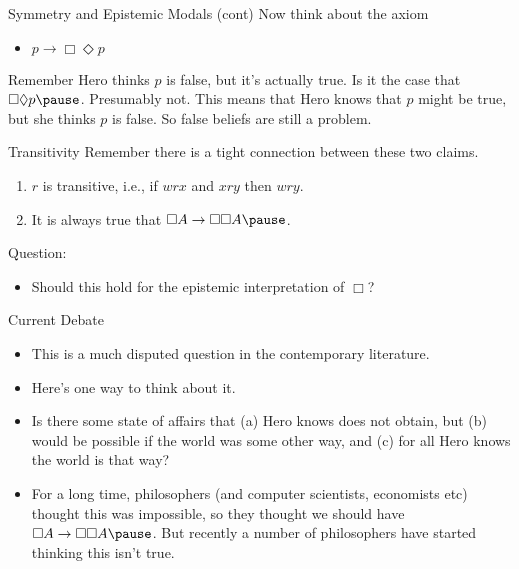 \documentclass[
  14pt,
  letterpaper,
  ignorenonframetext,
]{beamer}
\providecommand{\tightlist}{%
  \setlength{\itemsep}{0pt}\setlength{\parskip}{0pt}}\usepackage{longtable,booktabs,array}
\begin{document}
\begin{frame}{Symmetry and Epistemic Modals (cont)}
\protect\hypertarget{symmetry-and-epistemic-modals-cont}{}
Now think about the axiom

\begin{itemize}
\tightlist
\item
  \(p \rightarrow \Box \Diamond p\)
\end{itemize}

Remember Hero thinks \(p\) is false, but it's actually true. Is it the
case that \(\Box \Diamond p \pause\). Presumably not. This means that
Hero knows that \(p\) might be true, but she thinks \(p\) is false. So
false beliefs are still a problem.
\end{frame}

\begin{frame}{Transitivity}
\protect\hypertarget{transitivity}{}
Remember there is a tight connection between these two claims.

\begin{enumerate}
\tightlist
\item
  \(r\) is transitive, i.e., if \(wrx\) and \(xry\) then \(wry\).
\item
  It is always true that \(\Box A \rightarrow \Box \Box A \pause\).
\end{enumerate}

Question:

\begin{itemize}
\tightlist
\item
  Should this hold for the epistemic interpretation of \(\Box\)?
\end{itemize}
\end{frame}

\begin{frame}{Current Debate}
\protect\hypertarget{current-debate}{}
\begin{itemize}
\tightlist
\item
  This is a much disputed question in the contemporary literature.
\item
  Here's one way to think about it.
\item
  Is there some state of affairs that (a) Hero knows does not obtain,
  but (b) would be possible if the world was some other way, and (c) for
  all Hero knows the world is that way? \pause
\item
  For a long time, philosophers (and computer scientists, economists
  etc) thought this was impossible, so they thought we should have
  \(\Box A \rightarrow \Box \Box A \pause\). But recently a number of
  philosophers have started thinking this isn't true.
\end{itemize}
\end{frame}
\end{document}
